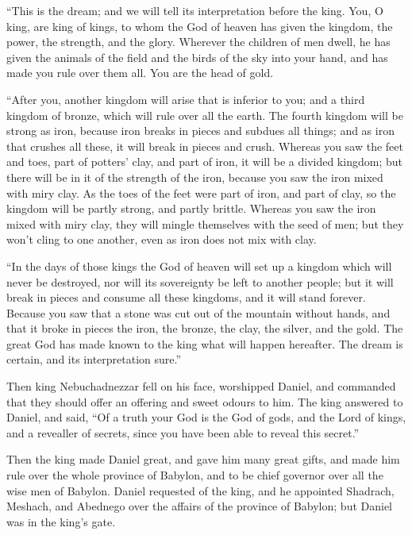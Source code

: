  ``This is the dream; and we will tell its interpretation
before the king.  You, O king, are king of kings, to whom
the God of heaven has given the kingdom, the power, the strength, and
the glory.  Wherever the children of men dwell, he has
given the animals of the field and the birds of the sky into your hand,
and has made you rule over them all. You are the head of gold.

 ``After you, another kingdom will arise that is inferior
to you; and a third kingdom of bronze, which will rule over all the
earth.  The fourth kingdom will be strong as iron, because
iron breaks in pieces and subdues all things; and as iron that crushes
all these, it will break in pieces and crush.  Whereas you
saw the feet and toes, part of potters' clay, and part of iron, it will
be a divided kingdom; but there will be in it of the strength of the
iron, because you saw the iron mixed with miry clay.  As
the toes of the feet were part of iron, and part of clay, so the kingdom
will be partly strong, and partly brittle.  Whereas you saw
the iron mixed with miry clay, they will mingle themselves with the seed
of men; but they won't cling to one another, even as iron does not mix
with clay.

 ``In the days of those kings the God of heaven will set up
a kingdom which will never be destroyed, nor will its sovereignty be
left to another people; but it will break in pieces and consume all
these kingdoms, and it will stand forever.  Because you saw
that a stone was cut out of the mountain without hands, and that it
broke in pieces the iron, the bronze, the clay, the silver, and the
gold. The great God has made known to the king what will happen
hereafter. The dream is certain, and its interpretation sure.''

 Then king Nebuchadnezzar fell on his face, worshipped
Daniel, and commanded that they should offer an offering and sweet
odours to him.  The king answered to Daniel, and said, ``Of
a truth your God is the God of gods, and the Lord of kings, and a
revealler of secrets, since you have been able to reveal this secret.''

 Then the king made Daniel great, and gave him many great
gifts, and made him rule over the whole province of Babylon, and to be
chief governor over all the wise men of Babylon.  Daniel
requested of the king, and he appointed Shadrach, Meshach, and Abednego
over the affairs of the province of Babylon; but Daniel was in the
king's gate.

